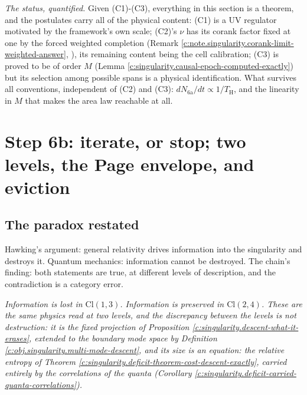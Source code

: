 \documentclass[11pt]{article}
\theoremstyle{definition}
\theoremstyle{plain}
\providecommand{\Cl}{}\renewcommand{\Cl}{\mathrm{Cl}}
\providecommand{\TH}{}\renewcommand{\TH}{T_{\mathrm{H}}}
\begin{document}
\label{c:note.singularity.setting-step-6a-iterate-or-stop-3}
\emph{The status, quantified.} Given (C1)-(C3), everything in this section is a theorem, and the postulates carry all of the physical content: (C1) is a UV regulator motivated by the framework's own scale; (C2)'s $\nu$ has its corank factor fixed at one by the forced weighted completion (Remark \ref{c:note.singularity.corank-limit-weighted-answer}, \cite[\S 8.9]{ButlerT4}), its remaining content being the cell calibration; (C3) is proved to be of order $M$ (Lemma \ref{c:singularity.causal-epoch-computed-exactly}) but its selection among possible spans is a physical identification. What survives all conventions, independent of (C2) and (C3): $dN_{\mathrm{6a}}/dt \propto 1/\TH$, and the linearity in $M$ that makes the area law reachable at all.

\section{Step 6b: iterate, or stop; two levels, the Page envelope, and eviction}

\subsection*{The paradox restated}
\label{c:note.singularity.setting-paradox-restated}
Hawking's argument: general relativity drives information into the singularity and destroys it. Quantum mechanics: information cannot be destroyed. The chain's finding: both statements are true, at different levels of description, and the contradiction is a category error.

\begin{center}
\emph{Information is lost in $\Cl(1,3)$. Information is preserved in $\Cl(2,4)$. These are the same physics read at two levels, and the discrepancy between the levels is not destruction: it is the fixed projection of Proposition \ref{c:singularity.descent-what-it-erases}, extended to the boundary mode space by Definition \ref{c:obj.singularity.multi-mode-descent}, and its size is an equation: the relative entropy of Theorem \ref{c:singularity.deficit-theorem-cost-descent-exactly}, carried entirely by the correlations of the quanta (Corollary \ref{c:singularity.deficit-carried-quanta-correlations}).}
\end{center}
\end{document}
